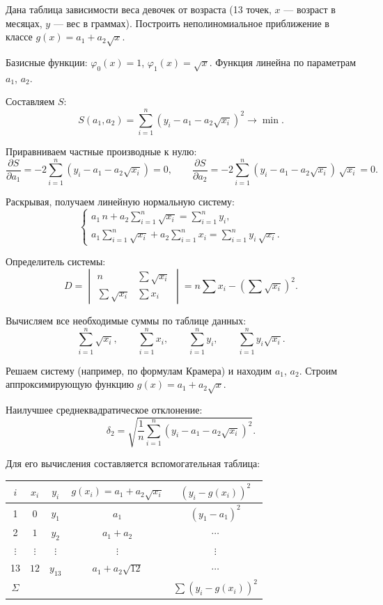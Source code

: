 Дана таблица зависимости веса девочек от возраста (13 точек, $x$ --- возраст в месяцах, $y$ --- вес в граммах). Построить неполиномиальное приближение в классе $g(x) = a_1 + a_2\sqrt{x}$.

Базисные функции: $\varphi_0(x) = 1$, $\varphi_1(x) = \sqrt{x}$. Функция линейна по параметрам $a_1$, $a_2$.

Составляем $S$:
\[
    S(a_1, a_2) = \sum_{i=1}^{n} (y_i - a_1 - a_2\sqrt{x_i})^2 \longrightarrow \min.
\]

Приравниваем частные производные к нулю:
\[
    \frac{\partial S}{\partial a_1} = -2 \sum_{i=1}^{n} (y_i - a_1 - a_2\sqrt{x_i}) = 0, \qquad
    \frac{\partial S}{\partial a_2} = -2 \sum_{i=1}^{n} (y_i - a_1 - a_2\sqrt{x_i})\,\sqrt{x_i} = 0.
\]

Раскрывая, получаем линейную нормальную систему:
\[
    \begin{cases}
        \displaystyle a_1\, n + a_2 \sum_{i=1}^{n} \sqrt{x_i} = \sum_{i=1}^{n} y_i, \\[8pt]
        \displaystyle a_1 \sum_{i=1}^{n} \sqrt{x_i} + a_2 \sum_{i=1}^{n} x_i = \sum_{i=1}^{n} y_i\,\sqrt{x_i}.
    \end{cases}
\]

Определитель системы:
\[
    D = \begin{vmatrix}
        n & \displaystyle\sum \sqrt{x_i} \\[4pt]
        \displaystyle\sum \sqrt{x_i} & \displaystyle\sum x_i
    \end{vmatrix}
    = n \sum x_i - \left(\sum \sqrt{x_i}\right)^2.
\]

Вычисляем все необходимые суммы по таблице данных:
\[
    \sum_{i=1}^{n} \sqrt{x_i}, \qquad \sum_{i=1}^{n} x_i, \qquad \sum_{i=1}^{n} y_i, \qquad \sum_{i=1}^{n} y_i\sqrt{x_i}.
\]

Решаем систему (например, по формулам Крамера) и находим $a_1$, $a_2$. Строим аппроксимирующую функцию $g(x) = a_1 + a_2\sqrt{x}$.

Наилучшее среднеквадратическое отклонение:
\[
    \delta_2 = \sqrt{\frac{1}{n} \sum_{i=1}^{n} (y_i - a_1 - a_2\sqrt{x_i})^2}.
\]

Для его вычисления составляется вспомогательная таблица:

\begin{center}
\begin{tabular}{c|c|c|c|c}
    $i$ & $x_i$ & $y_i$ & $g(x_i) = a_1 + a_2\sqrt{x_i}$ & $(y_i - g(x_i))^2$ \\
    \hline
    1 & $0$ & $y_1$ & $a_1$ & $(y_1 - a_1)^2$ \\
    2 & $1$ & $y_2$ & $a_1 + a_2$ & $\cdots$ \\
    $\vdots$ & $\vdots$ & $\vdots$ & $\vdots$ & $\vdots$ \\
    13 & $12$ & $y_{13}$ & $a_1 + a_2\sqrt{12}$ & $\cdots$ \\
    \hline
    $\Sigma$ & & & & $\sum(y_i - g(x_i))^2$
\end{tabular}
\end{center}

